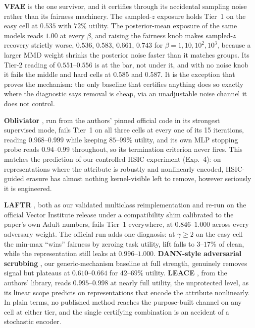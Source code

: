 \textbf{VFAE} \citep{louizos2016vfae} is the one survivor, and it
certifies through its accidental sampling noise rather than its fairness
machinery. The sampled-$z$ exposure holds Tier~1 on the easy cell at
$0.535$ with $72\%$ utility. The posterior-mean exposure of the same
models reads $1.00$ at every $\beta$, and raising the fairness knob makes
sampled-$z$ recovery strictly worse, $0.536$, $0.583$, $0.661$, $0.743$
for $\beta = 1, 10, 10^2, 10^3$, because a larger MMD weight shrinks the
posterior noise faster than it matches groups. Its Tier-2 reading of
$0.551$--$0.556$ is at the bar, not under it, and with no noise knob it
fails the middle and hard cells at $0.585$ and $0.587$. It is the
exception that proves the mechanism: the only baseline that certifies
anything does so exactly where the diagnostic says removal is cheap, via
an unadjustable noise channel it does not control.

\textbf{Obliviator} \citep{akbari2025obliviator}, run from the authors'
pinned official code in its strongest supervised mode, fails Tier~1 on
all three cells at every one of its 15 iterations, reading
$0.968$--$0.999$ while keeping $85$--$99\%$ utility, and its own MLP
stopping probe reads $0.94$--$0.99$ throughout, so its termination
criterion never fires. This matches the prediction of our controlled
HSIC experiment (Exp.~4): on representations where the attribute is
robustly and nonlinearly encoded, HSIC-guided erasure has almost nothing
kernel-visible left to remove, however seriously it is engineered.

\textbf{LAFTR} \citep{madras2018laftr}, both as our validated multiclass
reimplementation and re-run on the official Vector Institute release
under a compatibility shim calibrated to the paper's own Adult numbers,
fails Tier~1 everywhere, at $0.846$--$1.000$ across every adversary
weight. The official run adds one diagnosis: at $\gamma \ge 2$ on the
easy cell the min-max ``wins'' fairness by zeroing task utility, lift
falls to $3$--$17\%$ of clean, while the representation still leaks at
$0.996$--$1.000$. \textbf{DANN-style adversarial scrubbing}
\citep{ganin2015dann}, our generic-mechanism baseline at full strength,
genuinely removes signal but plateaus at $0.610$--$0.664$ for
$42$--$69\%$ utility. \textbf{LEACE} \citep{belrose2023leace}, from the
authors' library, reads $0.995$--$0.998$ at nearly full utility, the
unprotected level, as its linear scope predicts on representations that
encode the attribute nonlinearly. In plain terms, no published method
reaches the purpose-built channel on any cell at either tier, and the
single certifying combination is an accident of a stochastic encoder.
